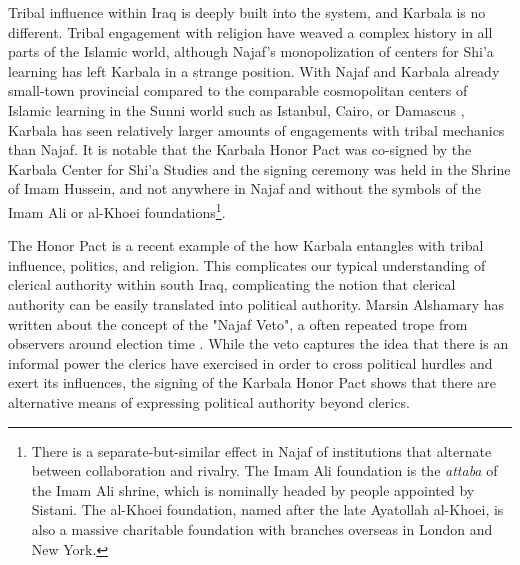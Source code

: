 Tribal influence within Iraq is deeply built into the system, and Karbala is no different. Tribal engagement with religion have weaved a complex history in all parts of the Islamic world, although Najaf's monopolization of centers for Shi'a learning has left Karbala in a strange position. With Najaf and Karbala already small-town provincial compared to the comparable cosmopolitan centers of Islamic learning in the Sunni world such as Istanbul, Cairo, or Damascus \cite{litvak_shii_2002}, Karbala has seen relatively larger amounts of engagements with tribal mechanics than Najaf. It is notable that the Karbala Honor Pact was co-signed by the Karbala Center for Shi'a Studies and the signing ceremony was held in the Shrine of Imam Hussein, and not anywhere in Najaf and without the symbols of the Imam Ali or al-Khoei foundations\footnote{There is a separate-but-similar effect in Najaf of institutions that alternate between collaboration and rivalry. The Imam Ali foundation is the \emph{attaba} of the Imam Ali shrine, which is nominally headed by people appointed by Sistani. The al-Khoei foundation, named after the late Ayatollah al-Khoei, is also a massive charitable foundation with branches overseas in London and New York.}. 


The Honor Pact is a recent example of the how Karbala entangles with tribal influence, politics, and religion. This complicates our typical understanding of clerical authority within south Iraq, complicating the notion that clerical authority can be easily translated into political authority. Marsin Alshamary has written about the concept of the "Najaf Veto", a often repeated trope from observers around election time \cite{alshamary_shia_2022}. While the veto captures the idea that there is an informal power the clerics have exercised in order to cross political hurdles and exert its influences, the signing of the Karbala Honor Pact shows that there are alternative means of expressing political authority beyond clerics. 

